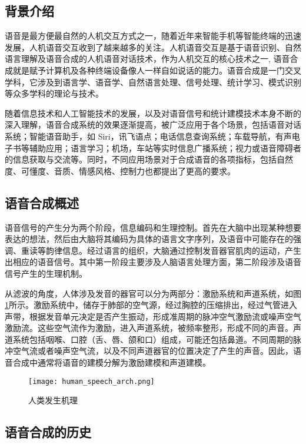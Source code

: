 \documentclass[cn,10pt,math=newtx,citestyle=gb7714-2015,bibstyle=gb7714-2015]{elegantbook}
\begin{document}
\subsection{背景介绍}

语音是最方便最自然的人机交互方式之一，随着近年来智能手机等智能终端的迅速发展，人机语音交互收到了越来越多的关注。人机语音交互是基于语音识别、自然语言理解及语音合成的人机语音对话技术，作为人机交互的核心技术之一, 语音合成就是赋予计算机及各种终端设备像人一样自如说话的能力。语音合成是一门交叉学科，它涉及到语言学、语音学、自然语言处理、信号处理、统计学习、模式识别等众多学科的理论与技术。

随着信息技术和人工智能技术的发展，以及对语音信号和统计建模技术本身不断的深入理解，语音合成系统的效果逐渐提高，被广泛应用于各个场景，包括语音对话系统；智能语音助手，如 Siri，讯飞语点；电话信息查询系统；车载导航，有声电子书等辅助应用；语言学习；机场，车站等实时信息广播系统；视力或语音障碍者的信息获取与交流等。同时，不同应用场景对于合成语音的各项指标，包括自然度、可懂度、音质、情感风格、控制力也都提出了更高的要求。

\subsection{语音合成概述}

  语音信号的产生分为两个阶段，信息编码和生理控制。首先在大脑中出现某种想要表达的想法，然后由大脑将其编码为具体的语言文字序列，及语音中可能存在的强调、重读等韵律信息。经过语言的组织，大脑通过控制发音器官肌肉的运动，产生出相应的语音信号。其中第一阶段主要涉及人脑语言处理方面，第二阶段涉及语音信号产生的生理机制。

  从滤波的角度，人体涉及发音的器官可以分为两部分：激励系统和声道系统，如图\ref{fig:human_speech_arch}所示。激励系统中，储存于肺部的空气源，经过胸腔的压缩排出，经过气管进入声带，根据发音单元决定是否产生振动，形成准周期的脉冲空气激励流或噪声空气激励流。这些空气流作为激励，进入声道系统，被频率整形，形成不同的声音。声道系统包括咽喉、口腔（舌、唇、颌和口）组成，可能还包括鼻道。不同周期的脉冲空气流或者噪声空气流，以及不同声道器官的位置决定了产生的声音。因此，语音合成中通常将语音的建模分解为激励建模和声道建模。

  \begin{figure}[htbp]
    \centering
    \texttt{[image: human\_speech\_arch.png]}
    \caption{人类发生机理 \label{fig:human_speech_arch}}
  \end{figure}

\subsection{语音合成的历史}
  
\end{document}
